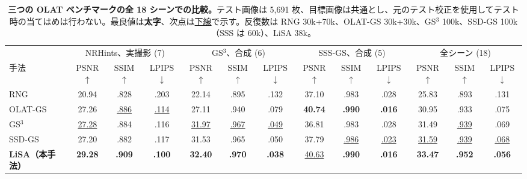\begin{table}[t]
\caption{\textbf{三つの OLAT ベンチマークの全 18 シーンでの比較。}テスト画像は 5,691 枚、目標画像は共通とし、元のテスト校正を使用してテスト時の当てはめは行わない。最良値は\textbf{太字}、次点は\underline{下線}で示す。反復数は RNG 30k+70k、OLAT-GS 30k+30k、GS$^3$ 100k、SSD-GS 100k（SSS は 60k）、LiSA 38k。}
\label{tab:main}
\centering\small
\setlength{\tabcolsep}{3.5pt}
\begin{tabular}{@{}l ccc ccc ccc ccc@{}}
\toprule
 & \multicolumn{3}{c}{NRHints、実撮影 (7)} & \multicolumn{3}{c}{GS$^3$、合成 (6)} & \multicolumn{3}{c}{SSS-GS、合成 (5)} & \multicolumn{3}{c}{全シーン (18)} \\
\cmidrule(lr){2-4}\cmidrule(lr){5-7}\cmidrule(lr){8-10}\cmidrule(l){11-13}
手法 & PSNR$\uparrow$ & SSIM$\uparrow$ & LPIPS$\downarrow$ & PSNR$\uparrow$ & SSIM$\uparrow$ & LPIPS$\downarrow$ & PSNR$\uparrow$ & SSIM$\uparrow$ & LPIPS$\downarrow$ & PSNR$\uparrow$ & SSIM$\uparrow$ & LPIPS$\downarrow$ \\
\midrule
RNG~\cite{fan2025rng} & 20.94 & .828 & .203 & 22.14 & .895 & .132 & 37.10 & .983 & .028 & 25.83 & .893 & .131 \\
OLAT-GS~\cite{kuang2024olat} & 27.26 & \underline{.886} & \underline{.114} & 27.11 & .940 & .079 & \textbf{40.74} & \textbf{.990} & \textbf{.016} & 30.95 & .933 & .075 \\
GS$^3$~\cite{bi2024gs3} & \underline{27.28} & .884 & .116 & \underline{31.97} & \underline{.967} & \underline{.049} & 36.81 & .983 & .028 & 31.49 & \underline{.939} & .069 \\
SSD-GS~\cite{zheng2026ssdgs} & 27.20 & .882 & .117 & 31.53 & .965 & .050 & 37.79 & \underline{.986} & \underline{.023} & \underline{31.59} & \underline{.939} & \underline{.068} \\
\midrule
\textbf{LiSA（本手法）} & \textbf{29.28} & \textbf{.909} & \textbf{.100} & \textbf{32.40} & \textbf{.970} & \textbf{.038} & \underline{40.63} & \textbf{.990} & \textbf{.016} & \textbf{33.47} & \textbf{.952} & \textbf{.056} \\
\bottomrule
\end{tabular}
\end{table}
